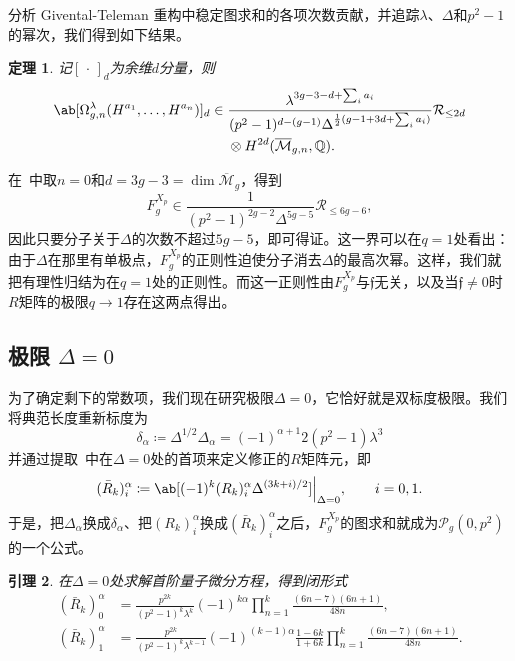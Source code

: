 \documentclass{amsart}
\newtheorem{thm}{定理}[section]
\newtheorem{lem}[thm]{引理}
\theoremstyle{definition}
\theoremstyle{remark}
\theoremstyle{plain}
\theoremstyle{definition}
\theoremstyle{remark}
\newcommand{\Q}{\mathbb{Q}}
\newcommand{\Mbar}{\overline{\mathcal{M}}}
\newcommand{\mc}[1]{\mathcal{#1}}
\newcommand{\mf}[1]{\mathfrak{#1}}
\newcommand{\1}{\mathbf{1}}
\newcommand{\2}{\mathbf{2}}
\newcommand{\3}{\mathbf{3}}
\begin{document}
分析 Givental-Teleman 重构中稳定图求和的各项次数贡献，并追踪\(\lambda\)、\(\Delta\)和\(p^2-1\)的幂次，我们得到如下结果。

\begin{thm}%
\label{thm:local P1 reconstruction}
    记\([\,\cdot\,]_d\)为余维\(d\)分量，则
    \begin{align*}
        \ab[\Omega^{\lambda}_{g,n}(H^{a_1},\ldots,H^{a_n})]_d \in{}& \frac{\lambda^{3g-3-d+\sum_i a_i}}{(p^2-1)^{d-(g-1)}\Delta^{\frac{1}{2}(g-1+3d+\sum_i a_i)}}\mc{R}_{\leq 2d} \\
        &\otimes H^{2d}(\Mbar_{g,n},\Q).
    \end{align*}
\end{thm}

在~中取\(n=0\)和\(d = 3g-3 = \dim \Mbar_g\)，得到
\[ F_g^{X_p} \in \frac{1}{(p^2-1)^{2g-2}\Delta^{5g-5}}\mc{R}_{\leq 6g-6}, \]
因此只要分子关于\(\Delta\)的次数不超过\(5g-5\)，即可得证。这一界可以在\(q=1\)处看出：由于\(\Delta\)在那里有单极点，\(F_g^{X_p}\)的正则性迫使分子消去\(\Delta\)的最高次幂。这样，我们就把有理性归结为在\(q=1\)处的正则性。而这一正则性由\(F_g^{X_p}\)与\(\mf{f}\)无关，以及当\(\mf{f} \neq 0\)时\(R\)矩阵的极限\(q \to 1\)存在这两点得出。

\subsection{极限 \(\Delta = 0\)}%
\label{sub:The limit Delta = 0}

为了确定剩下的常数项，我们现在研究极限\(\Delta = 0\)，它恰好就是双标度极限。我们将典范长度重新标度为
\[ \delta_{\alpha} \coloneqq \Delta^{1/2}\Delta_{\alpha} = (-1)^{\alpha+1}2(p^2-1)\lambda^3 \]
并通过提取~中在\(\Delta = 0\)处的首项来定义修正的\(R\)矩阵元，即
\[ (\bar{R}_k)_i^{\alpha} \coloneqq \ab[(-1)^k (R_k)_i^{\alpha}\Delta^{(3k+i)/2}]\Big|_{\Delta=0}, \qquad i = 0,1. \]
于是，把\(\Delta_{\alpha}\)换成\(\delta_{\alpha}\)、把\((R_k)_i^{\alpha}\)换成\((\bar{R}_k)_i^{\alpha}\)之后，\(F_g^{X_p}\)的图求和就成为\(\mc{P}_g(0,p^2)\)的一个公式。

\begin{lem}%
\label{lem:R matrix at Delta zero}
    在\(\Delta = 0\)处求解首阶量子微分方程，得到闭形式
    \begin{align*}
        (\bar{R}_k)_0^{\alpha} &= \frac{p^{2k}}{(p^2-1)^k\lambda^k}(-1)^{k\alpha}\prod_{n=1}^k \frac{(6n-7)(6n+1)}{48n}, \\
        (\bar{R}_k)_1^{\alpha} &= \frac{p^{2k}}{(p^2-1)^k \lambda^{k-1}}(-1)^{(k-1)\alpha}\frac{1-6k}{1+6k}\prod_{n=1}^k \frac{(6n-7)(6n+1)}{48n}.
    \end{align*}
\end{lem}
\end{document}
